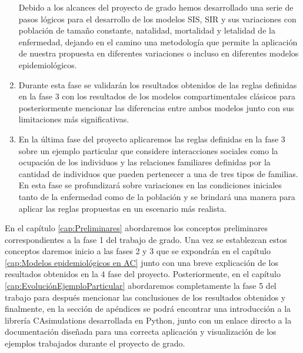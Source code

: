 \begin{enumerate}
    Debido a los alcances del proyecto de grado hemos desarrollado una serie de pasos lógicos para el desarrollo de los modelos SIS, SIR y sus variaciones con población de tamaño constante, natalidad, mortalidad y letalidad de la enfermedad, dejando en el camino una metodología que permite la aplicación de nuestra propuesta en diferentes variaciones o incluso en diferentes modelos epidemiológicos.
    \item Durante esta fase se validarán los resultados obtenidos de las reglas definidas en la fase 3 con los resultados de los modelos compartimentales clásicos para posteriormente mencionar las diferencias entre ambos modelos junto con sus limitaciones más significativas.
    \item En la última fase del proyecto aplicaremos las reglas definidas en la fase 3 sobre un ejemplo particular que considere interacciones sociales como la ocupación de los individuos y las relaciones familiares definidas por la cantidad de individuos que pueden pertenecer a una de tres tipos de familias. En esta fase se profundizará sobre variaciones en las condiciones iniciales tanto de la enfermedad como de la población y se brindará una manera para aplicar las reglas propuestas en un escenario más realista.
\end{enumerate}

En el capítulo \ref{cap:Preliminares} abordaremos los conceptos preliminares correspondientes a la fase 1 del trabajo de grado. Una vez se establezcan estos conceptos daremos inicio a las fases 2 y 3 que se expondrán en el capítulo \ref{cap:Modelos epidemiológicos en AC} junto con una breve explicación de los resultados obtenidos en la 4 fase del proyecto. Posteriormente, en el capítulo \ref{cap:EvoluciónEjemploParticular} abordaremos completamente la fase 5 del trabajo para después mencionar las conclusiones de los resultados obtenidos y finalmente, en la sección de apéndices se podrá encontrar una introducción a la librería CAsimulations desarrollada en Python, junto con un enlace directo a la documentación diseñada para una correcta aplicación y visualización de los ejemplos trabajados durante el proyecto de grado.